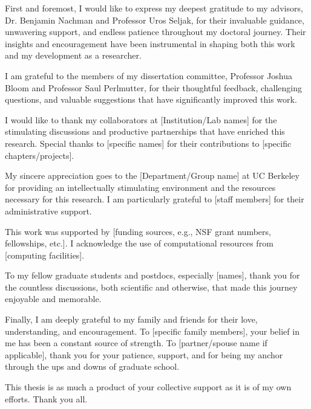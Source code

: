 
\begin{acknowledgements}

First and foremost, I would like to express my deepest gratitude to my advisors, Dr. Benjamin Nachman and Professor Uros Seljak, for their invaluable guidance, unwavering support, and endless patience throughout my doctoral journey. Their insights and encouragement have been instrumental in shaping both this work and my development as a researcher.

I am grateful to the members of my dissertation committee, Professor Joshua Bloom and Professor Saul Perlmutter, for their thoughtful feedback, challenging questions, and valuable suggestions that have significantly improved this work.

I would like to thank my collaborators at [Institution/Lab names] for the stimulating discussions and productive partnerships that have enriched this research. Special thanks to [specific names] for their contributions to [specific chapters/projects].

My sincere appreciation goes to the [Department/Group name] at UC Berkeley for providing an intellectually stimulating environment and the resources necessary for this research. I am particularly grateful to [staff members] for their administrative support.

This work was supported by [funding sources, e.g., NSF grant numbers, fellowships, etc.]. I acknowledge the use of computational resources from [computing facilities].

To my fellow graduate students and postdocs, especially [names], thank you for the countless discussions, both scientific and otherwise, that made this journey enjoyable and memorable.

Finally, I am deeply grateful to my family and friends for their love, understanding, and encouragement. To [specific family members], your belief in me has been a constant source of strength. To [partner/spouse name if applicable], thank you for your patience, support, and for being my anchor through the ups and downs of graduate school.

This thesis is as much a product of your collective support as it is of my own efforts. Thank you all.

\end{acknowledgements}